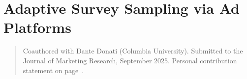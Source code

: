\chapter{Adaptive Survey Sampling via Ad Platforms}
\label{ch:survey-sampling}

\begin{quotation}
  \noindent\small Coauthored with Dante Donati (Columbia University).
  Submitted to the Journal of Marketing Research, September 2025. Personal
  contribution statement on page~\pageref{coauthor-statements}.
\end{quotation}



\printbibliography[heading=subbibliography, title={References for Chapter \thechapter}]
